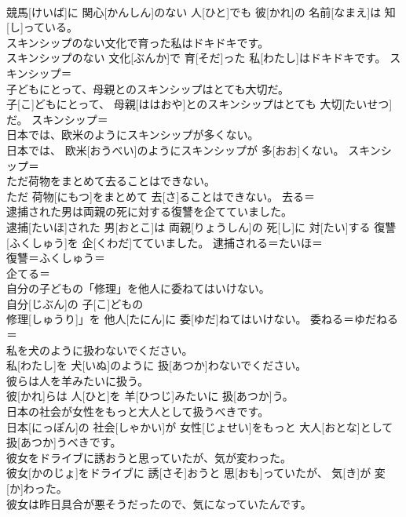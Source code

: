 \documentclass[8pt]{extreport}
\begin{document}
\begin{CJK}{UTF8}{min}
\\	競馬[けいば]に 関心[かんしん]のない 人[ひと]でも 彼[かれ]の 名前[なまえ]は 知[し]っている。	
\\	スキンシップのない文化で育った私はドキドキです。	
\\	スキンシップのない 文化[ぶんか]で 育[そだ]った 私[わたし]はドキドキです。	スキンシップ＝ 
\\	子どもにとって、母親とのスキンシップはとても大切だ。	
\\	子[こ]どもにとって、 母親[ははおや]とのスキンシップはとても 大切[たいせつ]だ。	スキンシップ＝ 
\\	日本では、欧米のようにスキンシップが多くない。	
\\	日本では、 欧米[おうべい]のようにスキンシップが 多[おお]くない。	スキンシップ＝ 
\\	ただ荷物をまとめて去ることはできない。	
\\	ただ 荷物[にもつ]をまとめて 去[さ]ることはできない。	去る＝ 
\\	逮捕された男は両親の死に対する復讐を企てていました。	
\\	逮捕[たいほ]された 男[おとこ]は 両親[りょうしん]の 死[し]に 対[たい]する 復讐[ふくしゅう]を 企[くわだ]てていました。	逮捕される＝たいほ＝ 
\\	復讐＝ふくしゅう＝ 
\\	企てる＝ 
\\	自分の子どもの「修理」を他人に委ねてはいけない。	
\\	自分[じぶん]の 子[こ]どもの
\\	修理[しゅうり]」を 他人[たにん]に 委[ゆだ]ねてはいけない。	委ねる＝ゆだねる＝ 
\\	私を犬のように扱わないでください。	
\\	私[わたし]を 犬[いぬ]のように 扱[あつか]わないでください。	
\\	彼らは人を羊みたいに扱う。	
\\	彼[かれ]らは 人[ひと]を 羊[ひつじ]みたいに 扱[あつか]う。	
\\	日本の社会が女性をもっと大人として扱うべきです。	
\\	日本[にっぽん]の 社会[しゃかい]が 女性[じょせい]をもっと 大人[おとな]として 扱[あつか]うべきです。	
\\	彼女をドライブに誘おうと思っていたが、気が変わった。	
\\	彼女[かのじょ]をドライブに 誘[さそ]おうと 思[おも]っていたが、 気[き]が 変[か]わった。	
\\	彼女は昨日具合が悪そうだったので、気になっていたんです。	

\end{CJK}
\end{document}
